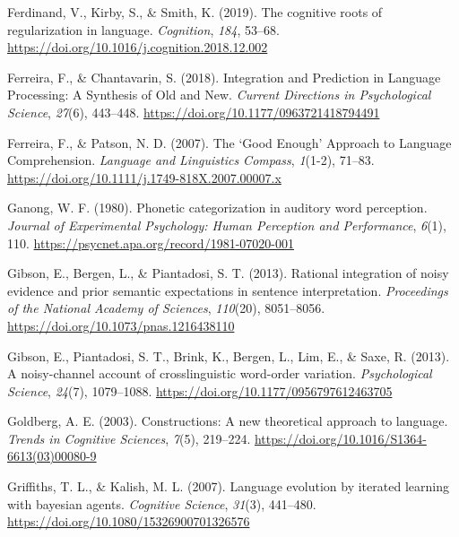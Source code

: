 \documentclass[
  12pt,
  letterpaper,
]{scrreprt}
\newlength{\cslhangindent}
\newenvironment{CSLReferences}[2] %
 {\begin{list}{}{%
  \setlength{\itemindent}{0pt}
  \setlength{\leftmargin}{0pt}
  \setlength{\parsep}{0pt}
  \ifodd #1
   \setlength{\leftmargin}{\cslhangindent}
   \setlength{\itemindent}{-1\cslhangindent}
  \fi
  \setlength{\itemsep}{#2\baselineskip}}}
 {\end{list}}
\begin{document}
\begin{CSLReferences}{1}{0}
Ferdinand, V., Kirby, S., \& Smith, K. (2019). The cognitive roots of
regularization in language. \emph{Cognition}, \emph{184}, 53--68.
\url{https://doi.org/10.1016/j.cognition.2018.12.002}

Ferreira, F., \& Chantavarin, S. (2018). Integration and Prediction in
Language Processing: A Synthesis of Old and New. \emph{Current
Directions in Psychological Science}, \emph{27}(6), 443--448.
\url{https://doi.org/10.1177/0963721418794491}

Ferreira, F., \& Patson, N. D. (2007). The {`}Good Enough{'} Approach to
Language Comprehension. \emph{Language and Linguistics Compass},
\emph{1}(1-2), 71--83.
\url{https://doi.org/10.1111/j.1749-818X.2007.00007.x}

Ganong, W. F. (1980). Phonetic categorization in auditory word
perception. \emph{Journal of Experimental Psychology: Human Perception
and Performance}, \emph{6}(1), 110.
\url{https://psycnet.apa.org/record/1981-07020-001}

Gibson, E., Bergen, L., \& Piantadosi, S. T. (2013). Rational
integration of noisy evidence and prior semantic expectations in
sentence interpretation. \emph{Proceedings of the National Academy of
Sciences}, \emph{110}(20), 8051--8056.
\url{https://doi.org/10.1073/pnas.1216438110}

Gibson, E., Piantadosi, S. T., Brink, K., Bergen, L., Lim, E., \& Saxe,
R. (2013). A noisy-channel account of crosslinguistic word-order
variation. \emph{Psychological Science}, \emph{24}(7), 1079--1088.
\url{https://doi.org/10.1177/0956797612463705}

Goldberg, A. E. (2003). Constructions: A new theoretical approach to
language. \emph{Trends in Cognitive Sciences}, \emph{7}(5), 219--224.
\url{https://doi.org/10.1016/S1364-6613(03)00080-9}

Griffiths, T. L., \& Kalish, M. L. (2007). Language evolution by
iterated learning with bayesian agents. \emph{Cognitive Science},
\emph{31}(3), 441--480. \url{https://doi.org/10.1080/15326900701326576}


\end{CSLReferences}
\end{document}
